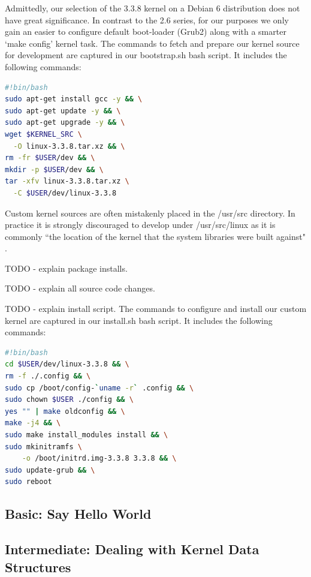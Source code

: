 \documentclass{article}
\begin{document}
\noindent Admittedly, our selection of the 3.3.8 kernel on a Debian 6 distribution
does not have great significance. In contrast to the 2.6 series, for our purposes 
we only gain an easier to configure default boot-loader (Grub2) along with a smarter 
`make config' kernel task. The commands to fetch and prepare our kernel source
for development are captured in our bootstrap\@.sh bash script. It includes the following commands: 
\begin{lstlisting}[language=Bash]
#!bin/bash
sudo apt-get install gcc -y && \
sudo apt-get update -y && \
sudo apt-get upgrade -y && \
wget $KERNEL_SRC \
  -O linux-3.3.8.tar.xz && \
rm -fr $USER/dev && \
mkdir -p $USER/dev && \
tar -xfv linux-3.3.8.tar.xz \
  -C $USER/dev/linux-3.3.8
\end{lstlisting} 
Custom kernel sources are often mistakenly placed in the /usr/src directory. 
In practice it is strongly discouraged to develop under /usr/src/linux as it is
commonly ``the location of the kernel that 
the system libraries were built against" \citep{Love}.
\par TODO - explain package installs.
\par TODO - explain all source code changes.
\par TODO - explain install script. The commands to configure and install our custom kernel
are captured in our install\@.sh bash script. 
It includes the following commands: 
\begin{lstlisting}[language=Bash]
#!bin/bash
cd $USER/dev/linux-3.3.8 && \
rm -f ./.config && \
sudo cp /boot/config-`uname -r` .config && \
sudo chown $USER ./config && \
yes "" | make oldconfig && \
make -j4 && \
sudo make install_modules install && \
sudo mkinitramfs \
    -o /boot/initrd.img-3.3.8 3.3.8 && \
sudo update-grub && \
sudo reboot
\end{lstlisting}   
  
  
\subsection{Basic: Say Hello World}
\lipsum[1]

\subsection{Intermediate: Dealing with Kernel Data Structures}
\lipsum[1]
\end{document}
